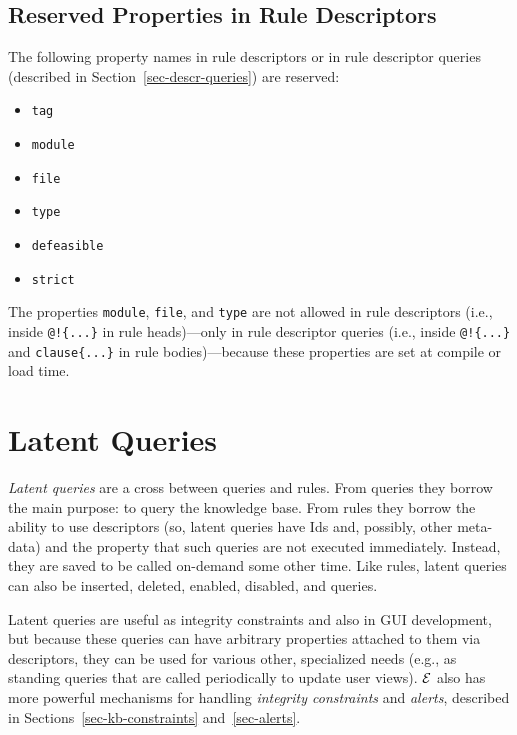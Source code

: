 \documentclass[11pt]{article}
\newcommand{\ERGO}{\mbox{\ensuremath{\cal{E}}\smaller{{\sc{RGO}}}}\xspace}
\begin{document}
\subsection{Reserved Properties in Rule Descriptors}

The following property names in rule descriptors or in rule descriptor
queries (described in Section~\ref{sec-descr-queries}) are reserved:
\begin{itemize}
\item  \texttt{tag}
\item  \texttt{module}
\item  \texttt{file}
\item  \texttt{type}
\item \texttt{defeasible}
\item \texttt{strict}  
\end{itemize}
The properties \texttt{module}, \texttt{file}, and \texttt{type}  are not allowed in rule
descriptors (i.e., inside \texttt{@!\{...\}} in rule heads)---only in rule descriptor queries (i.e.,
inside \texttt{@!\{...\}} and \texttt{clause\{...\}} in rule
bodies)---because these properties are set
at compile or load time.  


\section{Latent Queries}
\label{sec-latent-query}

\emph{Latent queries} are a cross between queries and rules. From queries  
they borrow the main purpose: to query the knowledge base. From rules
they borrow the ability to use descriptors (so, latent queries have Ids and,
possibly, other meta-data) and the property that such queries are not
executed immediately. Instead, they are saved to be called on-demand some
other time. Like rules, latent queries can also be inserted, deleted,
enabled, disabled, and queries.

Latent queries are useful as integrity constraints and also in GUI
development, but because these queries can have arbitrary properties
attached to them via descriptors, they can be used for various other,
specialized needs (e.g., as standing queries that are called periodically
to update user views).
\ERGO also has more
powerful mechanisms for handling \emph{integrity constraints} and
\emph{alerts}, described in Sections~\ref{sec-kb-constraints}
and~\ref{sec-alerts}.
\end{document}

